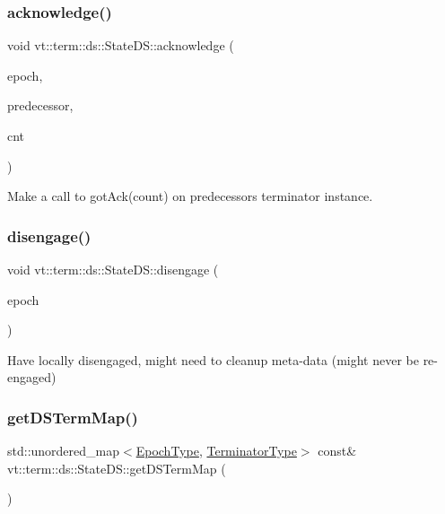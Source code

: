 \subsubsection{\texorpdfstring{acknowledge()}{acknowledge()}}
{\footnotesize\ttfamily void vt\+::term\+::ds\+::\+State\+D\+S\+::acknowledge (\begin{DoxyParamCaption}\item[{\hyperlink{namespacevt_a985a5adf291c34a3ca263b3378388236}{Epoch\+Type}}]{epoch,  }\item[{\hyperlink{structvt_1_1term_1_1ds_1_1_state_d_s_aba302de614dd639f5d93f4f5b6dd6108}{Endpoint}}]{predecessor,  }\item[{int64\+\_\+t}]{cnt }\end{DoxyParamCaption})\hspace{0.3cm}{\ttfamily [static]}}



Make a call to got\+Ack(count) on predecessor\textquotesingle{}s terminator instance. 

\mbox{\label{structvt_1_1term_1_1ds_1_1_state_d_s_a55a5290621f7de06a421793daba374e8}} 
\subsubsection{\texorpdfstring{disengage()}{disengage()}}
{\footnotesize\ttfamily void vt\+::term\+::ds\+::\+State\+D\+S\+::disengage (\begin{DoxyParamCaption}\item[{\hyperlink{namespacevt_a985a5adf291c34a3ca263b3378388236}{Epoch\+Type}}]{epoch }\end{DoxyParamCaption})\hspace{0.3cm}{\ttfamily [static]}}

Have locally disengaged, might need to cleanup meta-\/data (might never be re-\/engaged) \mbox{\label{structvt_1_1term_1_1ds_1_1_state_d_s_ac016de8bc9946fdf5386ff17b0ee3ab6}} 
\subsubsection{\texorpdfstring{get\+D\+S\+Term\+Map()}{getDSTermMap()}}
{\footnotesize\ttfamily std\+::unordered\+\_\+map$<$\hyperlink{namespacevt_a985a5adf291c34a3ca263b3378388236}{Epoch\+Type}, \hyperlink{structvt_1_1term_1_1ds_1_1_state_d_s_af98cfe31c25f710273ee103026d538e4}{Terminator\+Type}$>$ const\& vt\+::term\+::ds\+::\+State\+D\+S\+::get\+D\+S\+Term\+Map (\begin{DoxyParamCaption}{ }\end{DoxyParamCaption})\hspace{0.3cm}{\ttfamily [inline]}}

